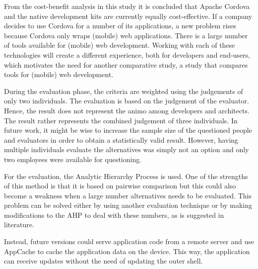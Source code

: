 From the cost-benefit analysis in this study it is concluded that Apache Cordova and the native development kits are currently equally cost-effective. If a company decides to use Cordova for a number of its applications, a new problem rises because Cordova only wraps (mobile) web applications. There is a large number of tools available for (mobile) web development. Working with each of these technologies will create a different experience, both for developers and end-users, which motivates the need for another comparative study, a study that compares tools for (mobile) web development. 

During the evaluation phase, the criteria are weighted using the judgements of only two individuals. The evaluation is based on the judgement of the evaluator. Hence, the result does not represent the animo among developers and architects. The result rather represents the combined judgement of three individuals. In future work, it might be wise to increase the sample size of the questioned people and evaluators in order to obtain a statistically valid result. However, having multiple individuals evaluate the alternatives was simply not an option and only two employees were available for questioning. 

For the evaluation, the Analytic Hierarchy Process is used. One of the strengths of this method is that it is based on pairwise comparison but this could also become a weakness when a large number alternatives needs to be evaluated. This problem can be solved either by using another evaluation technique or by making modifications to the AHP to deal with these numbers, as is suggested in literature.




Instead, future versions could serve application code from a remote server and use AppCache to cache the application data on the device. This way, the application can receive updates without the need of updating the outer shell.




